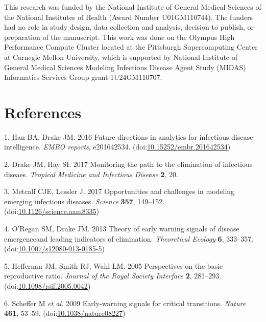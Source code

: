 \documentclass[3p]{elsarticle} %
\begin{document}
This research was funded by the National Institute of General Medical
Sciences of the National Institutes of Health (Award Number
U01GM110744). The funders had no role in study design, data collection
and analysis, decision to publish, or preparation of the manuscript.
This work was done on the Olympus High Performance Compute Cluster
located at the Pittsburgh Supercomputing Center at Carnegie Mellon
University, which is supported by National Institute of General Medical
Sciences Modeling Infectious Disease Agent Study (MIDAS) Informatics
Services Group grant 1U24GM110707.

\hypertarget{references}{%
\section*{References}\label{references}}

\hypertarget{refs}{}
\leavevmode\hypertarget{ref-Han2016}{}%
1. Han BA, Drake JM. 2016 Future directions in analytics for infectious
disease intelligence. \emph{EMBO reports}, e201642534.
(doi:\href{https://doi.org/10.15252/embr.201642534}{10.15252/embr.201642534})

\leavevmode\hypertarget{ref-Drake2017}{}%
2. Drake JM, Hay SI. 2017 Monitoring the path to the elimination of
infectious diseaes. \emph{Tropical Medicine and Infectious Disease}
\textbf{2}, 20.

\leavevmode\hypertarget{ref-Metcalf2017}{}%
3. Metcalf CJE, Lessler J. 2017 Opportunities and challenges in modeling
emerging infectious diseases. \emph{Science} \textbf{357}, 149--152.
(doi:\href{https://doi.org/10.1126/science.aam8335}{10.1126/science.aam8335})

\leavevmode\hypertarget{ref-ORegan2013}{}%
4. O'Regan SM, Drake JM. 2013 Theory of early warning signals of disease
emergenceand leading indicators of elimination. \emph{Theoretical
Ecology} \textbf{6}, 333--357.
(doi:\href{https://doi.org/10.1007/s12080-013-0185-5}{10.1007/s12080-013-0185-5})

\leavevmode\hypertarget{ref-Heffernan2005}{}%
5. Heffernan JM, Smith RJ, Wahl LM. 2005 Perspectives on the basic
reproductive ratio. \emph{Journal of the Royal Society Interface}
\textbf{2}, 281--293.
(doi:\href{https://doi.org/10.1098/rsif.2005.0042}{10.1098/rsif.2005.0042})

\leavevmode\hypertarget{ref-Scheffer2009}{}%
6. Scheffer M \emph{et al.} 2009 Early-warning signals for critical
transitions. \emph{Nature} \textbf{461}, 53--59.
(doi:\href{https://doi.org/10.1038/nature08227}{10.1038/nature08227})
\end{document}
